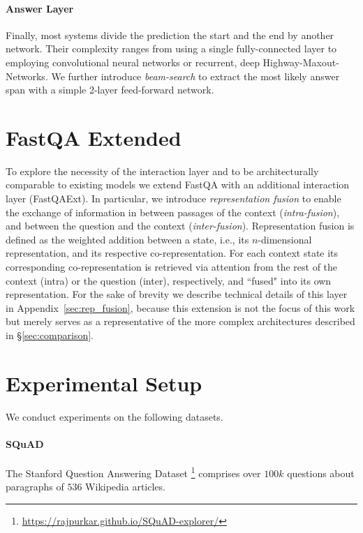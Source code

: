 \documentclass[11pt,a4paper]{article}
\begin{document}
\paragraph{Answer Layer} Finally, most systems divide the prediction the start and the end by another network. Their complexity ranges from using a single fully-connected layer \cite{Seo2017,Wang2017} to employing convolutional neural networks \cite{Trischler2017} or recurrent, deep Highway-Maxout-Networks\cite{Xiong2017}. We further introduce \textit{beam-search} to extract the most likely answer span with a simple 2-layer feed-forward network.

\section{FastQA Extended}
 
To explore the necessity of the interaction layer and to be architecturally comparable to existing models we extend FastQA with an additional interaction layer (FastQAExt). In particular, we introduce \textit{representation fusion} to enable the exchange of information in between passages of the context (\textit{intra-fusion}), and between the question and the context (\textit{inter-fusion}). Representation fusion is defined as the weighted addition between a state, i.e., its $n$-dimensional representation, and its respective co-representation. For each context state its corresponding co-representation is retrieved via attention from the rest of the context (intra) or the question (inter), respectively, and ``fused" into its own representation. For the sake of brevity we describe technical details of this layer in Appendix~\ref{sec:rep_fusion}, because this extension is not the focus of this work but merely serves as a representative of the more complex architectures described in \S\ref{sec:comparison}.

\section{Experimental Setup}

We conduct experiments on the following datasets.

\paragraph{SQuAD} The Stanford Question Answering Dataset \cite{Rajpurkar2016}\footnote{\url{https://rajpurkar.github.io/SQuAD-explorer/}} comprises over $100k$ questions about paragraphs of $536$ Wikipedia articles.
\end{document}
